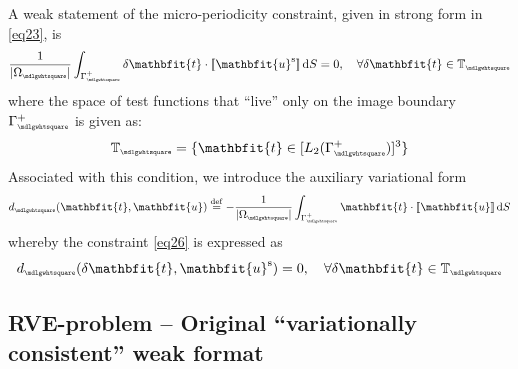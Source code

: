 \documentclass[12pt,a4paper]{article}
\renewcommand{\ta}[1]{\mathbfit{#1}}
\renewcommand{\Box}{\mdlgwhtsquare}
\DeclarePairedDelimiter{\jmp}{[\![}{]\!]}
\newcommand{\volume}{|\Omega_\rve|}
\newcommand{\rve}{
  {\mathchoice
   {\mbox{\scalebox{0.67}{$\Box$}}}
   {\mbox{\scalebox{0.67}{$\Box$}}}
   {\mbox{\scalebox{0.5}{$\Box$}}}
   {\mbox{\scalebox{0.375}{$\Box$}}}
  }
}
\begin{document}
A weak statement of the micro-periodicity constraint, given in strong form in \cref{eq23}, is
\begin{equation}
    \frac{1}{\volume}\int_{\Gamma_\rve^+} \delta \ta{t} \cdot \jmp{\ta{u}^\fluct} \dif S = 0,
    \quad \forall \delta \ta{t}\in\set{T}_{\rve}
\label{eq26}
\end{equation}
where the space of test functions that ``live'' only on the image boundary $\Gamma_{\rve}^+$ is given as:
\begin{equation}
    \set{T}_\rve = \{\ta{t}\in [L_2(\Gamma_\rve^+)]^{3}\}
\label{eq25a}
\end{equation}
Associated with this condition, we introduce the auxiliary variational form
\begin{equation}
    d_{\rve}(\ta{t},\ta{u}) \defeq
    - \frac{1}{\volume}\int_{\Gamma_\rve^+} \ta{t} \cdot \jmp{\ta{u}} \dif S
\label{eq27}
\end{equation}
whereby the constraint \cref{eq26} is expressed as
\begin{equation}
    d_{\rve}(\delta\ta{t},\ta{u}^\fluct) = 0, \quad \forall \delta \ta{t}\in\set{T}_{\rve}
\label{eq27a}
\end{equation}

\subsection{RVE-problem -- Original ``variationally consistent'' weak format}
\end{document}
